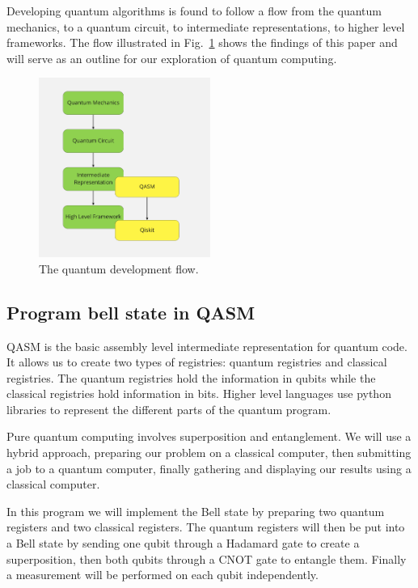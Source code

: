 \documentclass{article}
\begin{document}
Developing quantum algorithms is found to follow a flow from the quantum mechanics, to a quantum circuit, to intermediate representations, to higher level frameworks. The flow illustrated in Fig.~\ref{fig:devflow} shows the findings of this paper and will serve as an outline for our exploration of quantum computing. 
\begin{figure}[H]
    \centering
    \includegraphics[width=0.5\textwidth]{flowchart.png}
    \caption{The quantum development flow.}
    \label{fig:devflow}
\end{figure}

\subsection{Program bell state in QASM}

QASM is the basic assembly level intermediate representation for quantum code. It allows us to create two types of registries: quantum registries and classical registries. The quantum registries hold the information in qubits while the classical registries hold information in bits. Higher level languages use python libraries to represent the different parts of the quantum program.

Pure quantum computing involves superposition and entanglement. We will use a hybrid approach, preparing our problem on a classical computer, then submitting a job to a quantum computer, finally gathering and displaying our results using a classical computer. 

In this program we will implement the Bell state by preparing two quantum registers and two classical registers. The quantum registers will then be put into a Bell state by sending one qubit through a Hadamard gate to create a superposition, then both qubits through a CNOT gate to entangle them. Finally a measurement will be performed on each qubit independently.
\end{document}

